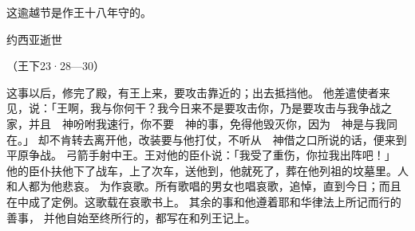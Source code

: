 {这逾越节是{}作王十八年守的。
\par }{\SH 约西亚逝世
\par }{\R （王下23·28—30）
\par }{\PP {}这事以后，{}修完了殿，有{}王{}上来，要攻击靠近{}的{}；{}出去抵挡他。
他差遣使者来见{}，说：「{}王啊，我与你何干？我今日来不是要攻击你，乃是要攻击与我争战之家，并且　神吩咐我速行，你不要{}　神的事，免得他毁灭你，因为　神是与我同在。」
却不肯转去离开他，改装要与他打仗，不听从　神借{}之口所说的话，便来到{}平原争战。
弓箭手射中{}王。王对他的臣仆说：「我受了重伤，你拉我出阵吧！」
他的臣仆扶他下了战车，上了次车，送他到{}，他就死了，葬在他列祖的坟墓里。{}人和{}人都为他悲哀。
为{}作哀歌。所有歌唱的男女也唱哀歌，追悼{}，直到今日；而且在{}中成了定例。这歌载在哀歌书上。
其余的事和他遵着耶和华律法上所记而行的善事，
并他自始至终所行的，都写在{}和{}列王记上。

}
